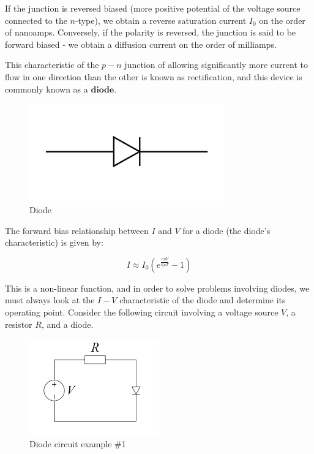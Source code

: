 \documentclass{article}
\begin{document}
If the junction is reversed biased (more positive potential of the voltage source connected to the $n$-type), we obtain a reverse saturation current $I_0$ on the order of nanoamps. Conversely, if the polarity is reversed, the junction is said to be forward biased - we obtain a diffusion current on the order of milliamps.

This characteristic of the $p-n$ junction of allowing significantly more current to flow in one direction than the other is known as rectification, and this device is commonly known as a $\textbf{diode}$.

\begin{figure}[h]
    \centering
    \includegraphics[width=0.75\textwidth]{images/diode1.png}
    \caption{Diode}
    \label{fig:diode1}
\end{figure}

The forward bias relationship between $I$ and $V$ for a diode (the diode's characteristic) is given by:

\[ I \approx I_0\left(e^{\frac{e\eta V}{k_BT}} - 1\right) \]

This is a non-linear function, and in order to solve problems involving diodes, we must always look at the $I-V$ characteristic of the diode and determine its operating point. Consider the following circuit involving a voltage source $V$, a resistor $R$, and a diode.

\begin{figure}[h]
    \centering
    \includegraphics[width=0.5\textwidth]{images/diode2.png}
    \caption{Diode circuit example \#1}
    \label{fig:diode2}
\end{figure}
\end{document}
